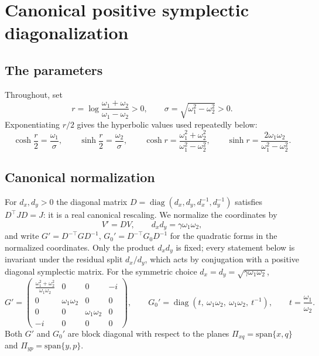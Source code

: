 \documentclass[11pt]{article}
\theoremstyle{definition}
\theoremstyle{remark}
\newcommand{\w}{\omega}
\newcommand{\diag}{\operatorname{diag}}
\begin{document}
\section{Canonical positive symplectic diagonalization}\label{sec:diag}

\subsection{The parameters}

Throughout, set
\begin{equation}\label{eq:r}
r=\log\frac{\w_1+\w_2}{\w_1-\w_2}>0,
\qquad
\sigma=\sqrt{\w_1^2-\w_2^2}>0 .
\end{equation}
Exponentiating $r/2$ gives the hyperbolic values used repeatedly below:
\begin{equation}\label{eq:hyp}
\cosh\frac r2=\frac{\w_1}{\sigma},\qquad
\sinh\frac r2=\frac{\w_2}{\sigma},\qquad
\cosh r=\frac{\w_1^2+\w_2^2}{\w_1^2-\w_2^2},\qquad
\sinh r=\frac{2\w_1\w_2}{\w_1^2-\w_2^2}.
\end{equation}

\subsection{Canonical normalization}\label{ssec:normalization}

For $d_x,d_y>0$ the diagonal matrix
$D=\diag(d_x,d_y,d_x^{-1},d_y^{-1})$ satisfies $D^{\top}JD=J$: it is a real
canonical rescaling.  We normalize the coordinates by
\begin{equation}\label{eq:normalization}
V'=DV,\qquad d_xd_y=\gamma\w_1\w_2,
\end{equation}
and write $G'=D^{-\top}GD^{-1}$, $G_0'=D^{-\top}G_0D^{-1}$ for the quadratic
forms in the normalized coordinates.  Only the product $d_xd_y$ is fixed;
every statement below is invariant under the residual split
$d_x/d_y$, which acts by conjugation with a positive diagonal symplectic
matrix.  For the symmetric choice $d_x=d_y=\sqrt{\gamma\w_1\w_2}$,
\begin{equation}\label{eq:Gprime}
G'=\begin{pmatrix}
\frac{\w_1^2+\w_2^2}{\w_1\w_2}&0&0&-i\\[2pt]
0&\w_1\w_2&0&0\\
0&0&\w_1\w_2&0\\
-i&0&0&0
\end{pmatrix},
\qquad
G_0'=\diag\!\left(t,\ \w_1\w_2,\ \w_1\w_2,\ t^{-1}\right),
\qquad t=\frac{\w_1}{\w_2} .
\end{equation}
Both $G'$ and $G_0'$ are block diagonal with respect to the planes
$\Pi_{xq}=\mathrm{span}\{x,q\}$ and $\Pi_{yp}=\mathrm{span}\{y,p\}$.
\end{document}
